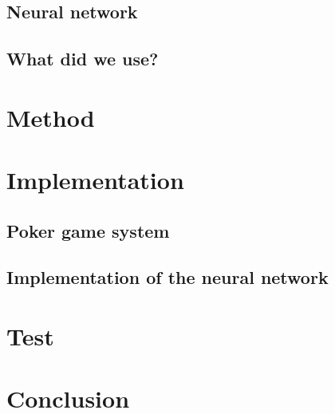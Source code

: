 \subsection{Neural network}

\subsection{What did we use?}

\section{Method}

\section{Implementation}
\subsection{Poker game system}
\subsection{Implementation of the neural network}

\section{Test}

\section{Conclusion}


